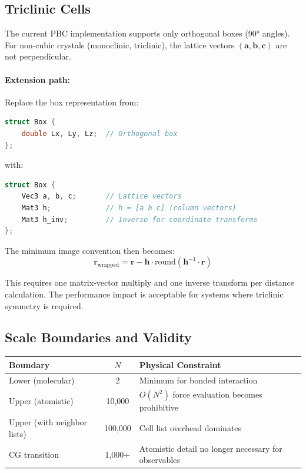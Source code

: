 \documentclass[11pt]{article}
\begin{document}
\subsection{Triclinic Cells}

The current PBC implementation supports only orthogonal boxes (90° angles). For non-cubic crystals (monoclinic, triclinic), the lattice vectors $(\mathbf{a}, \mathbf{b}, \mathbf{c})$ are not perpendicular.

\paragraph{Extension path:}

Replace the box representation from:
\begin{lstlisting}[language=C++]
struct Box {
    double Lx, Ly, Lz;  // Orthogonal box
};
\end{lstlisting}

with:
\begin{lstlisting}[language=C++]
struct Box {
    Vec3 a, b, c;       // Lattice vectors
    Mat3 h;             // h = [a b c] (column vectors)
    Mat3 h_inv;         // Inverse for coordinate transforms
};
\end{lstlisting}

The minimum image convention then becomes:
\begin{equation}
\mathbf{r}_{\text{wrapped}} = \mathbf{r} - \mathbf{h} \cdot \text{round}(\mathbf{h}^{-1} \cdot \mathbf{r})
\end{equation}

This requires one matrix-vector multiply and one inverse transform per distance calculation. The performance impact is acceptable for systems where triclinic symmetry is required.

\subsection{Scale Boundaries and Validity}

\begin{center}
\begin{tabular}{lcp{7cm}}
\toprule
Boundary & $N$ & Physical Constraint \\
\midrule
Lower (molecular) & 2 & Minimum for bonded interaction \\
Upper (atomistic) & 10,000 & $O(N^2)$ force evaluation becomes prohibitive \\
Upper (with neighbor lists) & 100,000 & Cell list overhead dominates \\
CG transition & 1,000+ & Atomistic detail no longer necessary for observables \\
\bottomrule
\end{tabular}
\end{center}
\end{document}

